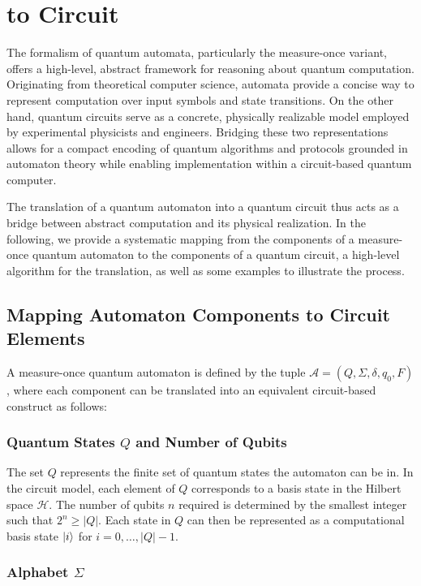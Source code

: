 \section{ to Circuit}
\label{sec:moqfa-to-circuit}

The formalism of quantum automata, particularly the measure-once variant, offers a high-level, abstract framework for reasoning about quantum computation. Originating from theoretical computer science, automata provide a concise way to represent computation over input symbols and state transitions. On the other hand, quantum circuits serve as a concrete, physically realizable model employed by experimental physicists and engineers. Bridging these two representations allows for a compact encoding of quantum algorithms and protocols grounded in automaton theory while enabling implementation within a circuit-based quantum computer.

The translation of a quantum automaton into a quantum circuit thus acts as a bridge between abstract computation and its physical realization. In the following, we provide a systematic mapping from the components of a measure-once quantum automaton to the components of a quantum circuit, a high-level algorithm for the translation, as well as some examples to illustrate the process.

\subsection{Mapping Automaton Components to Circuit Elements}

A measure-once quantum automaton is defined by the tuple $\mathcal{A} = (Q, \Sigma, \delta, q_0, F)$, where each component can be translated into an equivalent circuit-based construct as follows:

\subsubsection{Quantum States $Q$ and Number of Qubits}

The set $Q$ represents the finite set of quantum states the automaton can be in. In the circuit model, each element of $Q$ corresponds to a basis state in the Hilbert space $\mathcal{H}$. The number of qubits $n$ required is determined by the smallest integer such that $2^n \geq |Q|$. Each state in $Q$ can then be represented as a computational basis state $\ket{i}$ for $i = 0, \dots, |Q|-1$.

\subsubsection{Alphabet $\Sigma$}

